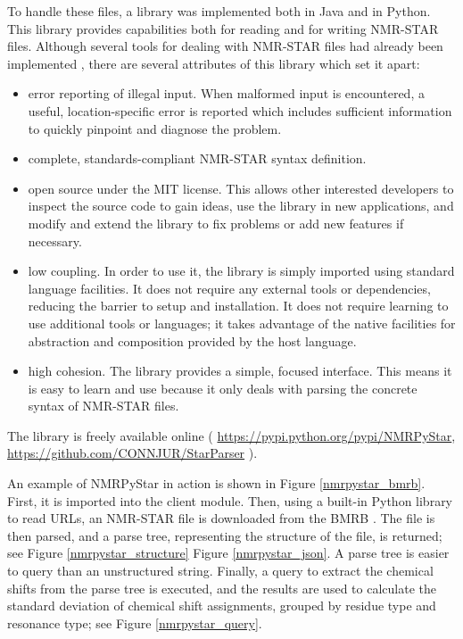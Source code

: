To handle these files, a library was implemented both in Java 
\cite{fenwick2013} and in Python.  This library provides capabilities both
for reading and for writing NMR-STAR files.  Although several tools for
dealing with NMR-STAR files had already been implemented \cite{ccpn, bmrb},
there are several attributes of this library which set it apart:
\begin{itemize}
  \item error reporting of illegal input.  When malformed input is encountered,
    a useful, location-specific error is reported which includes sufficient
    information to quickly pinpoint and diagnose the problem.
  \item complete, standards-compliant NMR-STAR syntax definition.
  \item open source under the MIT license.  This allows other interested 
    developers to inspect the source code to gain ideas, use the library in
    new applications, and modify and extend the library to fix problems or
    add new features if necessary.
  \item low coupling.  In order to use it, the library is simply imported 
    using standard language facilities.  It does not require any external tools
    or dependencies, reducing the barrier to setup and installation.  It does
    not require learning to use additional tools or languages; 
    it takes advantage of the native facilities for abstraction
    and composition provided by the host language.
  \item high cohesion.  The library provides a simple, focused interface.
    This means it is easy to learn and use because it only deals with parsing
    the concrete syntax of NMR-STAR files.
\end{itemize}
The library is freely available online (
\url{https://pypi.python.org/pypi/NMRPyStar}, 
\url{https://github.com/CONNJUR/StarParser}
).

An example of NMRPyStar in action is shown in Figure \ref{nmrpystar_bmrb}.
First, it is imported into the client module.  Then, using a built-in Python 
library to read URLs, an NMR-STAR file is downloaded
from the BMRB \cite{bmrb}.  The file is then parsed, and a parse tree, 
representing the structure of the file, is returned; see 
Figure \ref{nmrpystar_structure} Figure \ref{nmrpystar_json}.  
A parse tree is easier to query than an unstructured string.  
Finally, a query to extract the chemical shifts
from the parse tree is executed, and the results are used to calculate the
standard deviation of chemical shift assignments, grouped by residue type
and resonance type; see Figure \ref{nmrpystar_query}.

